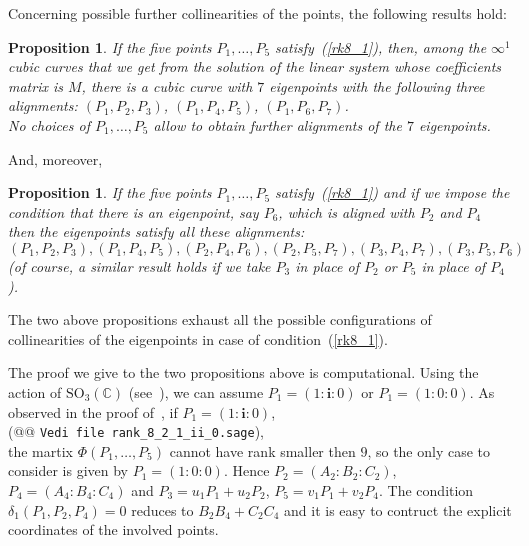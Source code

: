 \documentclass[11pt, a4paper, reqno, captions=tableheading,bibliography=totoc]{scrartcl}
\theoremstyle{plain}
\newtheorem{prop}[lemma]{Proposition}
\theoremstyle{definition}
\newcommand{\iii}{\textbf{i}}
\begin{document}
Concerning possible further collinearities of the points, the following
results hold:
\begin{prop}
\label{three_d_three_alinments}
If the five points $P_1, \dots, P_5$ satisfy~(\ref{rk8_1}),
then, among the $\infty^1$ cubic curves that we get from the
solution of the linear system whose coefficients matrix is $M$, there is 
a cubic curve with $7$ eigenpoints with the following three alignments:
$(P_1, P_2, P_3)$, $(P_1, P_4, P_5)$, $(P_1, P_6, P_7)$. \\
No choices of $P_1, \dots, P_5$ allow to obtain further alignments of the
$7$ eigenpoints.
\end{prop}
And, moreover,
\begin{prop}
\label{prop:d2_6allin}
If the five points $P_1, \dots, P_5$ satisfy~(\ref{rk8_1})
and if we impose the condition that there is an eigenpoint, say $P_6$, 
which is aligned with $P_2$ and $P_4$ then the eigenpoints satisfy all these
alignments:
\[
(P_1, P_2, P_3), (P_1, P_4, P_5), (P_2, P_4, P_6), (P_2, P_5, P_7),
(P_3, P_4, P_7), (P_3, P_5, P_6)
\]
(of course, a similar result holds if we take $P_3$ in place of $P_2$ or $P_5$
in place of $P_4$).
\end{prop}
The two above propositions exhaust all the possible configurations
of collinearities of the eigenpoints in case of condition~(\ref{rk8_1}).

The proof we give to the two propositions above is computational.
Using the action of $\mathrm{SO}_3(\mathbb{C})$ (see~),
we can assume $P_1= (1: \iii: 0)$ or $P_1= (1: 0: 0)$. As observed
in the proof of~, if $P_1 = (1: \iii: 0)$,\\
(@@ \verb+Vedi file rank_8_2_1_ii_0.sage+), \\
the martix
$\Phi(P_1, \dots, P_5)$ cannot have rank smaller then $9$, so the only
case to consider is given by $P_1 = (1: 0: 0)$. Hence
$P_2 = (A_2: B_2: C_2)$, $P_4 = (A_4: B_4: C_4)$ and
$P_3 = u_1P_1+u_2P_2$, $P_5=v_1P_1+v_2P_4$.
The condition $\delta_1(P_1, P_2, P_4)=0$ reduces to $B_2B_4+C_2C_4$
and it is easy to contruct the explicit coordinates of the involved points.
\end{document}
